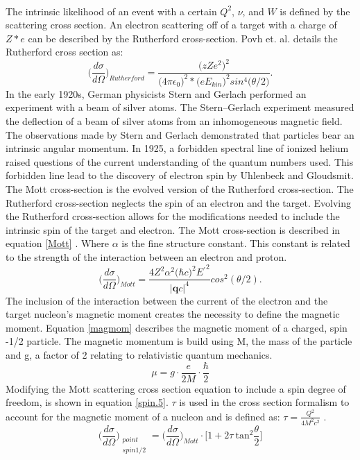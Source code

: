 \paragraph{} The intrinsic likelihood of an event with a certain $Q^2$, $\nu$, and $W$ is defined by the scattering cross section. An electron scattering off of a target with a charge of $Z*e$ can be described by the Rutherford cross-section. Povh et. al. details the Rutherford cross section as:
\begin{equation}
\bigg(\frac{d\sigma}{d\Omega}\bigg)_{Rutherford} = \frac{ \big(zZe^2\big)^2} {\big( 4\pi \epsilon_0\big)^2 * \big(e E_{kin}\big)^2 sin^4\big( \theta / 2 \big) }. 
\end{equation}
In the early 1920s, German physicists Stern and Gerlach performed an experiment with a beam of silver atoms. The Stern–Gerlach experiment measured the deflection of a beam of silver atoms from an inhomogeneous magnetic field\cite{strger}. The observations made by Stern and Gerlach demonstrated that particles bear an intrinsic angular momentum. In 1925, a forbidden spectral line of ionized helium raised questions of the current understanding of the quantum numbers used. This forbidden line lead to the discovery of electron spin by Uhlenbeck and Gloudsmit\cite{e_spin}. The Mott cross-section is the evolved version of the Rutherford cross-section. The Rutherford cross-section neglects the spin of an electron and the target. Evolving the Rutherford cross-section allows for the modifications needed to include the intrinsic spin of the target and electron. The Mott cross-section is described in equation \ref{Mott} \cite{HighE,PnN}.  Where $\alpha$ is the fine structure constant. This constant is related to the strength of the interaction between an electron and proton\cite{sane}.
\begin{equation}
\bigg(\frac{d\sigma}{d\Omega}\bigg)_{Mott} = \frac{4Z^2\alpha^2 \big(\hbar c \big)^2 E{^{\prime} }^2}{ |\boldsymbol{q}c|^4} cos^2 (\theta/2). \label{Mott}
\end{equation}
The inclusion of the interaction between the current of the electron and the target nucleon's magnetic moment creates the necessity to define the magnetic moment. Equation \ref{magmom} describes the magnetic moment of a charged, spin -1/2 particle. The magnetic momentum is build using M, the mass of the particle and g, a factor of 2 relating to relativistic quantum mechanics. 
\begin{equation}
\mu = g \cdot \frac{e}{2M}\cdot\frac{\hbar}{2} \label{magmom}
\end{equation}
Modifying the Mott scattering cross section equation to include a spin degree of freedom, is shown in equation \ref{spin.5}. $\tau$ is used in the cross section formalism to account for the magnetic moment of a nucleon and is defined as: $\tau = \frac{Q^2}{4M^2c^2}$ \cite{PnN}. 
\begin{equation}
\bigg(\frac{d\sigma}{d\Omega}\bigg)_{\substack{point \\ spin 1/2}} = \bigg(\frac{d\sigma}{d\Omega}\bigg)_{Mott} \cdot \big[1 + 2\tau \: \text{tan}^2\frac{\theta}{2} \big]\label{spin.5}
\end{equation}

